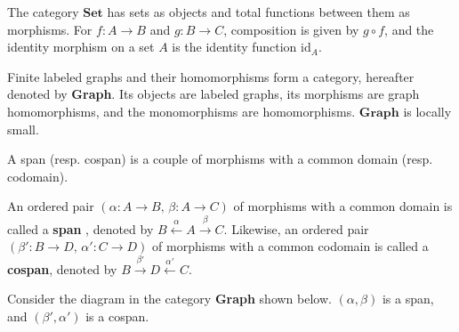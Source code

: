 \begin{example}
The category \(\mathbf{Set}\) has sets as objects and total functions between them as morphisms. For \(f\colon A\to B\) and \(g\colon B\to C\), composition is given by \(g\circ f\), and the identity morphism on a set \(A\) is the identity function \(\mathrm{id}_A\).
\end{example}

\begin{example} 
    Finite labeled graphs and their homomorphisms form a category, hereafter denoted by \textbf{Graph}. Its objects are labeled graphs, its morphisms are graph homomorphisms, and the monomorphisms are homomorphisms. 
    $\textbf{Graph}$ is locally small. 
\end{example}

 
A span (resp. cospan) is a couple of morphisms with a common domain (resp. codomain).
\begin{definition}
An ordered pair \((\alpha : A \to B,\, \beta : A \to C)\) of morphisms with a common domain is called a \textbf{span} \cite{lowe2010graph}, denoted by
\(
B \overset{\alpha}{\leftarrow} A \overset{\beta}{\rightarrow} C
\). 
Likewise, an ordered pair \((\beta' : B \to D,\, \alpha' : C \to D)\) of morphisms with a common codomain is called a \textbf{cospan}, denoted by
\(
B \overset{\beta'}{\rightarrow} D \overset{\alpha'}{\leftarrow} C
\). 
\end{definition}
\begin{example}
Consider the diagram in the category \textbf{Graph} shown below.
 $(\alpha, \beta)$ is a span, and $(\beta', \alpha')$ is a cospan.
\end{example}


